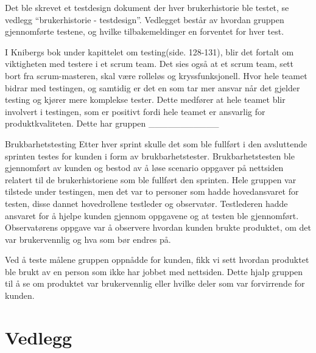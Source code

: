 \documentclass[12pt,a4paper,norsk]{article}
\begin{document}
Det ble skrevet et testdesign dokument der hver brukerhistorie ble testet, se vedlegg “brukerhistorie - testdesign”. Vedlegget består av hvordan gruppen gjennomførte testene, og hvilke tilbakemeldinger en forventet for hver test.

I Knibergs bok under kapittelet om testing(side. 128-131), blir det fortalt om viktigheten med testere i et scrum team. Det sies også at et scrum team, sett bort fra scrum-masteren, skal være rolleløs og kryssfunksjonell. Hvor hele teamet bidrar med testingen, og samtidig er det en som tar mer ansvar når det gjelder testing og kjører mere komplekse tester. Dette medfører at hele teamet blir involvert i testingen, som er positivt fordi hele teamet er ansvarlig for produktkvaliteten.
Dette har gruppen ___________

Brukbarhetstesting
Etter hver sprint skulle det som ble fullført i den avsluttende sprinten testes for kunden i form av brukbarhetstester. Brukbarhetstesten ble gjennomført av kunden og bestod av å løse scenario oppgaver på nettsiden relatert til de brukerhistoriene som ble fullført den sprinten. Hele gruppen var tilstede under testingen, men det var to personer som hadde hovedansvaret for testen, disse dannet hovedrollene testleder og observatør. Testlederen hadde ansvaret for å hjelpe kunden gjennom oppgavene og at testen ble gjennomført. Observatørens oppgave var å observere hvordan kunden brukte produktet, om det var brukervennlig og hva som bør endres på.

Ved å teste målene gruppen oppnådde for kunden, fikk vi sett hvordan produktet ble brukt av en person som ikke har jobbet med nettsiden. Dette hjalp gruppen til å se om produktet var brukervennlig eller hvilke deler som var forvirrende for kunden. 

\newpage
{}
{}


\section{Vedlegg}

\end{document}
